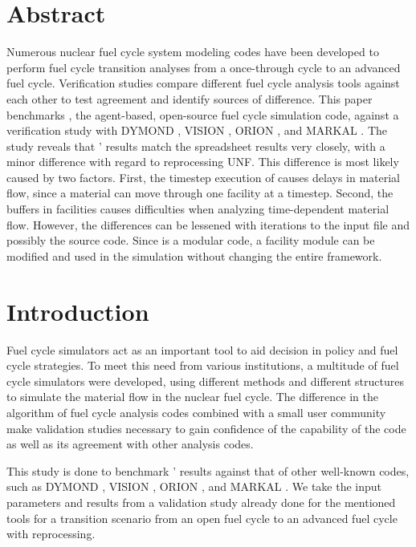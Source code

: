 \section{Abstract}
Numerous nuclear fuel cycle system modeling codes
have been developed to perform fuel cycle transition
analyses from a once-through cycle to an advanced
fuel cycle. Verification studies compare different
fuel cycle analysis tools against each other to
test agreement and identify sources of difference.
This paper benchmarks \Cyclus, the agent-based,
open-source fuel cycle simulation code, against
a verification study \cite{feng_standardized_2016} with
DYMOND \cite{yacout_2005_modeling},
VISION \cite{jacobson_2010_verifiable},
ORION \cite{gregg_2012_analysis}, and
MARKAL \cite{shay_2006_epa}. The study reveals
that \Cyclus' results match the spreadsheet results
very closely, with a minor difference with regard to
reprocessing \gls{UNF}. This difference is most
likely caused by two factors. First, the timestep execution of \Cyclus causes delays in material
flow, since a material can move through one
facility at a timestep. Second, the buffers in
\Cyclus facilities causes difficulties when
analyzing time-dependent material flow.
However, the differences can be lessened with
iterations to the input file and possibly the
source code. Since \Cyclus is a modular code,
a facility module can be modified and used in
the simulation without changing the entire framework.




\section{Introduction}
Fuel cycle simulators act as an important tool to
aid decision in policy and fuel cycle strategies.
To meet this need from various institutions, a
multitude of fuel cycle simulators were developed,
using different methods and different structures
to simulate the material flow in the nuclear fuel cycle.
The difference in the algorithm of fuel cycle analysis
codes combined with a small user community make
validation studies necessary to gain
confidence of the capability of the code as well as its
agreement with other analysis codes.

This study is done to benchmark \Cyclus' results
against that of other well-known codes, such as
DYMOND \cite{yacout_2005_modeling},
VISION \cite{jacobson_2010_verifiable},
ORION \cite{gregg_2012_analysis}, and
MARKAL \cite{shay_2006_epa}. We take the input
parameters and results from a validation study
\cite{feng_standardized_2016} already done for the
mentioned tools for a transition scenario from an
open fuel cycle to an advanced fuel cycle with
reprocessing.


